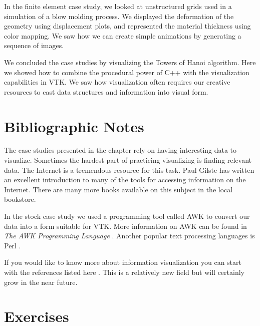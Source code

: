 In the finite element case study, we looked at unstructured grids used in a simulation of a blow molding process. We displayed the deformation of the geometry using displacement plots, and represented the material thickness using color mapping. We saw how we can create simple animations by generating a sequence of images.

We concluded the case studies by visualizing the Towers of Hanoi algorithm. Here we showed how to combine the procedural power of C++ with the visualization capabilities in VTK. We saw how visualization often requires our creative resources to cast data structures and information into visual form.


\section{Bibliographic Notes}

The case studies presented in the chapter rely on having interesting data to visualize. Sometimes the hardest part of practicing visualizing is finding relevant data. The Internet is a tremendous resource for this task. Paul Gilste \cite{Gilster94} has written an excellent introduction to many of the tools for accessing information on the Internet. There are many more books available on this subject in the local bookstore.

In the stock case study we used a programming tool called AWK to convert our data into a form suitable for VTK. More information on AWK can be found in \emph{The AWK Programming Language} \cite{Aho88}. Another popular text processing languages is Perl \cite{Perl95}.

If you would like to know more about information visualization you can start with the references listed here \cite{Becker95} \cite{Ding90} \cite{Eick93} \cite{Feiner88} \cite{Johnson91} \cite{Robertson91}. This is a relatively new field but will certainly grow in the near future.

\printbibliography

\section{Exercises}
\label{exercises:ch_12}

